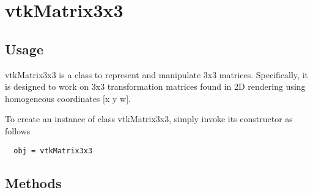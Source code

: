 \section{vtkMatrix3x3}

\subsection{Usage}

 vtkMatrix3x3 is a class to represent and manipulate 3x3 matrices.
 Specifically, it is designed to work on 3x3 transformation matrices
 found in 2D rendering using homogeneous coordinates [x y w].

To create an instance of class vtkMatrix3x3, simply
invoke its constructor as follows
\begin{verbatim}
  obj = vtkMatrix3x3
\end{verbatim}
\subsection{Methods}

